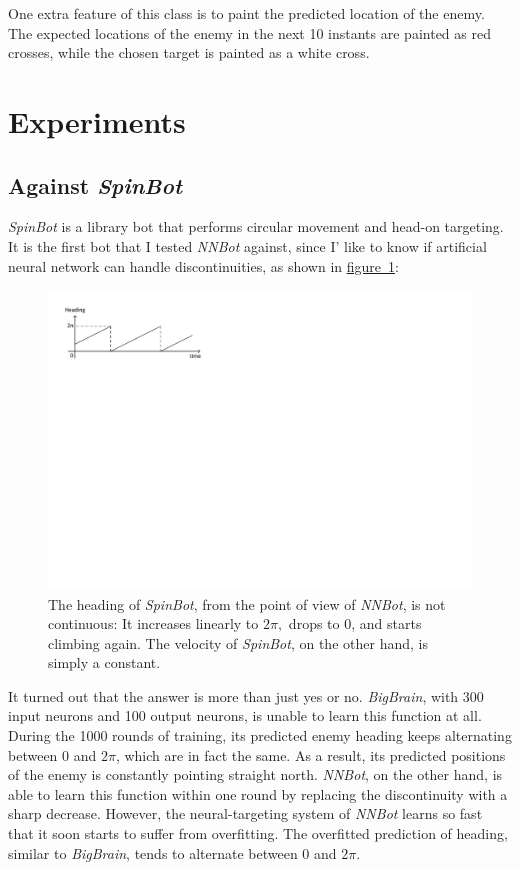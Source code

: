 \documentclass[11pt,a4paper]{article}
\begin{document}
One extra feature of this class is to paint the predicted location of the enemy. The expected locations of the enemy in the next 10 instants are painted as red crosses, while the chosen target is painted as a white cross.

\section{Experiments}

\subsection{Against \emph{SpinBot}}
\label{sec:spin}

\emph{SpinBot} is a library bot that performs circular movement and head-on targeting. It is the first bot that I tested \emph{NNBot} against, since I' like to know if artificial neural network can handle discontinuities, as shown in \hyperref[fig:discontinuity]{figure~\ref{fig:discontinuity}}:

\begin{figure}[h]
	\centering
	\includegraphics[scale=0.85]{discontinuity.pdf}
	\caption{The heading of \emph{SpinBot}, from the point of view of \emph{NNBot}, is not continuous: It increases linearly to $2\pi,$ drops to 0, and starts climbing again. The velocity of \emph{SpinBot}, on the other hand, is simply a constant.}
	\label{fig:discontinuity}
\end{figure}

It turned out that the answer is more than just yes or no. \emph{BigBrain}, with 300 input neurons and 100 output neurons, is unable to learn this function at all. During the 1000 rounds of training, its predicted enemy heading keeps alternating between 0 and $2\pi$, which are in fact the same. As a result, its predicted positions of the enemy is constantly pointing straight north. \emph{NNBot}, on the other hand, is able to learn this function within one round by replacing the discontinuity with a sharp decrease. However, the neural-targeting system of \emph{NNBot} learns so fast that it soon starts to suffer from overfitting. The overfitted prediction of heading, similar to \emph{BigBrain}, tends to alternate between 0 and $2\pi$.
\end{document}
